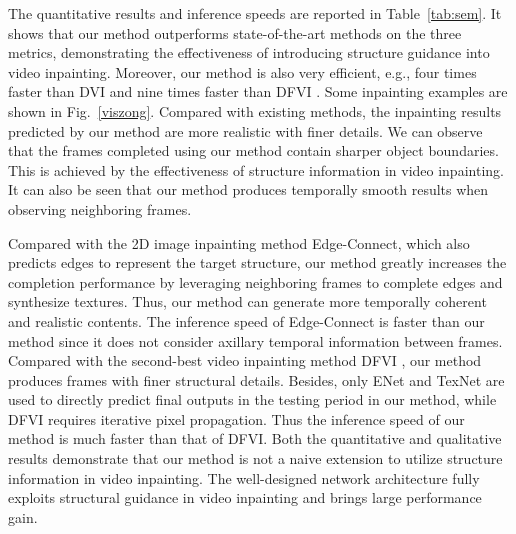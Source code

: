 The quantitative results and inference speeds are reported in Table~\ref{tab:sem}.
It shows that our method outperforms state-of-the-art methods on the three metrics, demonstrating the effectiveness of introducing structure guidance into video inpainting.
Moreover, our method is also very efficient, e.g., four times faster than DVI \cite{Kim_2019_CVPR1} and nine times faster than DFVI \cite{Xu_2019_CVPR}. 
Some inpainting examples are shown in Fig.~\ref{viszong}.
Compared with existing methods, the inpainting results predicted by our method are more realistic with finer details. 
We can observe that the frames completed using our method contain sharper object boundaries. This is achieved by the effectiveness of structure information in video inpainting.
%
It can also be seen that our method produces temporally smooth results when observing neighboring frames. 


Compared with the 2D image inpainting method Edge-Connect\cite{nazeri2019edgeconnect},
which also predicts edges to represent the target structure,
our method greatly increases the completion performance by leveraging neighboring frames to complete edges and synthesize textures. 
Thus, our method can generate more temporally coherent and realistic contents. The inference speed of Edge-Connect is faster than our method since it does not consider axillary temporal information between frames. 
%
Compared with the second-best video inpainting method DFVI \cite{Xu_2019_CVPR}, our method produces frames with finer structural details. Besides, only ENet and TexNet are used to directly predict final outputs in the testing period in our method, while DFVI requires iterative pixel propagation. Thus the inference speed of our method is much faster than that of DFVI.
%
Both the quantitative and qualitative results demonstrate that our method is not a naive extension to utilize structure information in video inpainting.
The well-designed network architecture fully exploits structural guidance in video inpainting and brings large performance gain.




